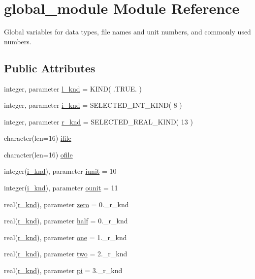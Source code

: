 \hypertarget{classglobal__module}{\section{global\-\_\-module Module Reference}
\label{classglobal__module}
}


Global variables for data types, file names and unit numbers, and commonly used numbers.  


\subsection*{Public Attributes}
\begin{DoxyCompactItemize}
\item 
integer, parameter \hyperlink{classglobal__module_a968ba1aa6e3f1767b59bfb8bd310405e}{l\-\_\-knd} = K\-I\-N\-D( .T\-R\-U\-E. )
\item 
integer, parameter \hyperlink{classglobal__module_a01b861666154d8b3e5bd725ae8933438}{i\-\_\-knd} = S\-E\-L\-E\-C\-T\-E\-D\-\_\-\-I\-N\-T\-\_\-\-K\-I\-N\-D( 8 )
\item 
integer, parameter \hyperlink{classglobal__module_ab88bc58495adcaa0c39aac0c541fe8c8}{r\-\_\-knd} = S\-E\-L\-E\-C\-T\-E\-D\-\_\-\-R\-E\-A\-L\-\_\-\-K\-I\-N\-D( 13 )
\item 
character(len=16) \hyperlink{classglobal__module_a94b80c776276c5e9e870df62cdc27b1d}{ifile}
\item 
character(len=16) \hyperlink{classglobal__module_aa25a5f9ded0bd9460cc9a5c842a6812b}{ofile}
\item 
integer(\hyperlink{classglobal__module_a01b861666154d8b3e5bd725ae8933438}{i\-\_\-knd}), parameter \hyperlink{classglobal__module_a734e710669b353233ba6b431d2b10a60}{iunit} = 10
\item 
integer(\hyperlink{classglobal__module_a01b861666154d8b3e5bd725ae8933438}{i\-\_\-knd}), parameter \hyperlink{classglobal__module_a3d8941f8c329162cde48206e253955f5}{ounit} = 11
\item 
real(\hyperlink{classglobal__module_ab88bc58495adcaa0c39aac0c541fe8c8}{r\-\_\-knd}), parameter \hyperlink{classglobal__module_aee835b3a70993d265b7592f2485da98a}{zero} = 0.\-\_\-r\-\_\-knd
\item 
real(\hyperlink{classglobal__module_ab88bc58495adcaa0c39aac0c541fe8c8}{r\-\_\-knd}), parameter \hyperlink{classglobal__module_aca3045154e42c1413c7e40cff43d609b}{half} = 0.\-\_\-r\-\_\-knd
\item 
real(\hyperlink{classglobal__module_ab88bc58495adcaa0c39aac0c541fe8c8}{r\-\_\-knd}), parameter \hyperlink{classglobal__module_ad2273c99f1e5fd95558f9217ed48f65f}{one} = 1.\-\_\-r\-\_\-knd
\item 
real(\hyperlink{classglobal__module_ab88bc58495adcaa0c39aac0c541fe8c8}{r\-\_\-knd}), parameter \hyperlink{classglobal__module_ae882a53fa5147b5a17b1de231a9edc1e}{two} = 2.\-\_\-r\-\_\-knd
\item 
real(\hyperlink{classglobal__module_ab88bc58495adcaa0c39aac0c541fe8c8}{r\-\_\-knd}), parameter \hyperlink{classglobal__module_ac248f55c9fa522378b386ab9456aec4e}{pi} = 3.\-\_\-r\-\_\-knd
\end{DoxyCompactItemize}


